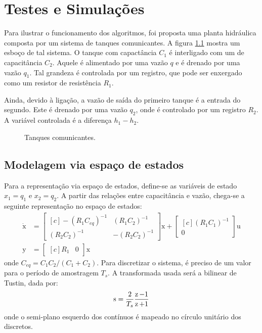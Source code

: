 \chapter{Testes e Simulações}

Para ilustrar o funcionamento dos algoritmos, foi proposta uma planta hidráulica composta por um sistema de tanques comunicantes. A figura \ref{fig:TanquesComunicantes} mostra um esboço de tal sistema. O tanque com capactância $C_1$ é interligado com um de capacitância $C_2$. Aquele é alimentado por uma vazão $q$ e é drenado por uma vazão $q_1$. Tal grandeza é controlada por um registro, que pode ser enxergado como um resistor de resistência $R_1$.

Ainda, devido à ligação, a vazão de saída do primeiro tanque é a entrada do segundo. Este é drenado por uma vazão $q_2$, onde é controlado por um registro $R_2$. A variável controlada é a diferença $h_1 - h_2$.

\begin{figure}[!ht]
  \centering
  
  \caption{Tanques comunicantes.}
  \label{fig:TanquesComunicantes}
\end{figure}

\section{Modelagem via espaço de estados}
Para a representação via espaço de estados, define-se as variáveis de estado $x_1 = q_1$ e $x_2 = q_2$. A partir das relações entre capacitância e vazão, chega-se a seguinte representação no espaço de estados:
\begin{subequations}
  \begin{align}
    \dot{\pmb{\mathrm{x}}} &= \begin{bmatrix*}[c]
      -(R_1C_{eq})^{-1} & (R_1C_2)^{-1}\\
      (R_2C_2)^{-1} & -(R_2C_2)^{-1}
    \end{bmatrix*}\pmb{\mathrm{x}} + \begin{bmatrix*}[c]
      (R_1C_1)^{-1}\\
      0
    \end{bmatrix*}\mathrm{u}\label{eq:SSEntrada}\\
    \mathrm{y} &= \begin{bmatrix*}[c]
      R_1 & 0
    \end{bmatrix*}\pmb{\mathrm{x}}\label{eq:SSSaida}
  \end{align}
\end{subequations}
onde $C_{eq} = C_1C_2/(C_1 + C_2)$. Para discretizar o sistema, é preciso de um valor para o período de amostragem $T_s$. A transformada usada será a bilinear de Tustin, dada por:
\begin{equation}
  \operatorname{\mathrm{s}} = \dfrac{2}{T_s}\dfrac{\operatorname{\mathrm{z}}-1}{\operatorname{\mathrm{z}}+1}\label{eq:BilinearTransform}
\end{equation}
onde o semi-plano esquerdo dos contínuos é mapeado no círculo unitário dos discretos.

